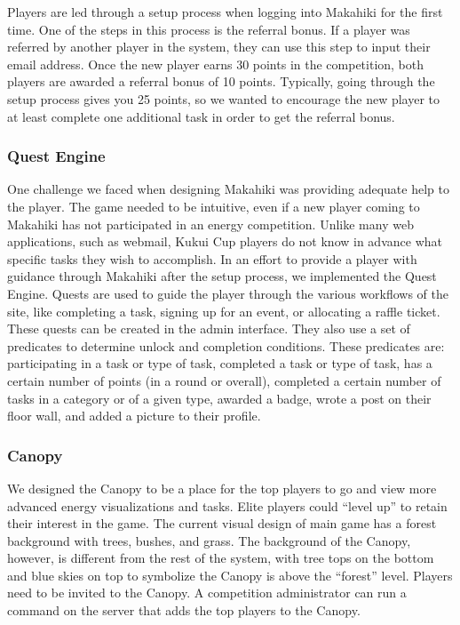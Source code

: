 \documentclass{acm_proc_article-sp}
\begin{document}
Players are led through a setup process when logging into Makahiki for the first time. One of the steps in this process is the referral bonus. If a player was referred by another player in the system, they can use this step to input their email address. Once the new player earns 30 points in the competition, both players are awarded a referral bonus of 10 points. Typically, going through the setup process gives you 25 points, so we wanted to encourage the new player to at least complete one additional task in order to get the referral bonus.

\subsubsection{Quest Engine}

One challenge we faced when designing Makahiki was providing adequate help to the player. The game needed to be intuitive, even if a new player coming to Makahiki has not participated in an energy competition. Unlike many web applications, such as webmail, Kukui Cup players do not know in advance what specific tasks they wish to accomplish. In an effort to provide a player with guidance through Makahiki after the setup process, we implemented the Quest Engine. Quests are used to guide the player through the various workflows of the site, like completing a task, signing up for an event, or allocating a raffle ticket. These quests can be created in the admin interface. They also use a set of predicates to determine unlock and completion conditions. These predicates are: participating in a task or type of task, completed a task or type of task, has a certain number of points (in a round or overall), completed a certain number of tasks in a category or of a given type, awarded a badge, wrote a post on their floor wall, and added a picture to their profile.

\subsubsection{Canopy}

We designed the Canopy to be a place for the top players to go and view more advanced energy visualizations and tasks. Elite players could ``level up'' to retain their interest in the game. The current visual design of main game has a forest background with trees, bushes, and grass. The background of the Canopy, however, is different from the rest of the system, with tree tops on the bottom and blue skies on top to symbolize the Canopy is above the ``forest'' level. Players need to be invited to the Canopy. A competition administrator can run a command on the server that adds the top players to the Canopy.
\end{document}
